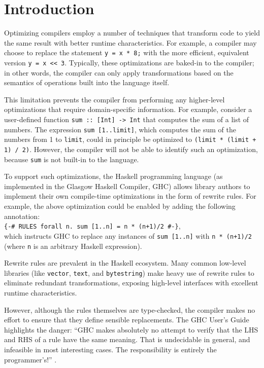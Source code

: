\section{Introduction}

Optimizing compilers employ a number of techniques that transform code to yield
the same result with better runtime characteristics. For example, a compiler may
choose to replace the statement \texttt{y = x * 8;} with the more efficient,
equivalent version \texttt{y = x << 3}. Typically, these optimizations are
baked-in to the compiler; in other words, the compiler can only apply
transformations based on the semantics of operations built into the language
itself.

This limitation prevents the compiler from performing any higher-level
optimizations that require domain-specific information. For example, consider a
user-defined function \texttt{sum :: [Int] -> Int} that computes the sum of a
list of numbers. The expression \texttt{sum [1..limit]}, which computes the sum
of the numbers from 1 to \texttt{limit}, could in principle be optimized to
\texttt{(limit * (limit + 1) / 2)}. However, the compiler will not be able to
identify such an optimization, because \texttt{sum} is not built-in to the
language.

To support such optimizations, the Haskell programming language (as implemented
in the Glasgow Haskell Compiler, GHC) allows library authors to implement their
own compile-time optimizations in the form of rewrite rules. For example, the
above optimization could be enabled by adding the following annotation:\\
\texttt{\{-\# RULES forall n. sum [1..n] = n * (n+1)/2 \#-\}},\\
which instructs GHC to replace any instances of \texttt{sum [1..n]} with
\texttt{n * (n+1)/2} (where \texttt{n} is an arbitrary Haskell expression).

Rewrite rules are prevalent in the Haskell ecosystem. Many common low-level
libraries (like \texttt{vector}, \texttt{text}, and \texttt{bytestring}) make
heavy use of rewrite rules to eliminate redundant transformations, exposing
high-level interfaces with excellent runtime characteristics.
\cite{coutts2007stream, chakravarty2002approach, chakravarty2007data,
shortcutwiki}

However, although the rules themselves are type-checked, the compiler makes no
effort to ensure that they define sensible replacements. The GHC User's Guide
highlights the danger: ``GHC makes absolutely no attempt to verify that the LHS
and RHS of a rule have the same meaning. That is undecidable in general, and
infeasible in most interesting cases. The responsibility is entirely the
programmer's!'' \cite{userguide}.

